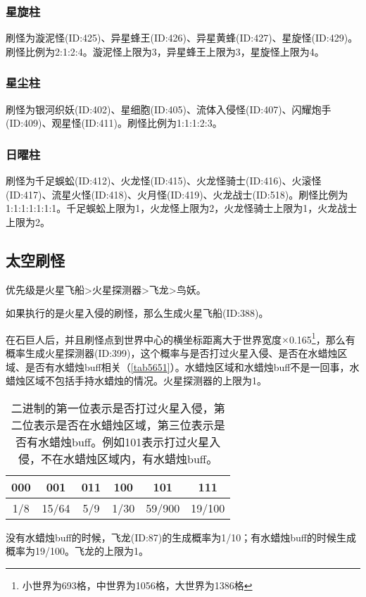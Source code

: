 \subsubsection{星旋柱}
刷怪为漩泥怪(ID:425)、异星蜂王(ID:426)、异星黄蜂(ID:427)、星旋怪(ID:429)。刷怪比例为2:1:2:4。漩泥怪上限为3，异星蜂王上限为3，星旋怪上限为4。

\subsubsection{星尘柱}
刷怪为银河织妖(ID:402)、星细胞(ID:405)、流体入侵怪(ID:407)、闪耀炮手(ID:409)、观星怪(ID:411)。刷怪比例为1:1:1:2:3。

\subsubsection{日曜柱}
刷怪为千足蜈蚣(ID:412)、火龙怪(ID:415)、火龙怪骑士(ID:416)、火滚怪(ID:417)、流星火怪(ID:418)、火月怪(ID:419)、火龙战士(ID:518)。刷怪比例为1:1:1:1:1:1:1。千足蜈蚣上限为1，火龙怪上限为2，火龙怪骑士上限为1，火龙战士上限为2。

\subsection{太空刷怪}
优先级是火星飞船>火星探测器>飞龙>鸟妖。

如果执行的是火星入侵的刷怪，那么生成火星飞船(ID:388)。

在石巨人后，并且刷怪点到世界中心的横坐标距离大于世界宽度$\times$0.165\footnote{小世界为693格，中世界为1056格，大世界为1386格}，那么有概率生成火星探测器(ID:399)，这个概率与是否打过火星入侵、是否在水蜡烛区域、是否有水蜡烛buff相关（\autoref{tab5651}）。水蜡烛区域和水蜡烛buff不是一回事，水蜡烛区域不包括手持水蜡烛的情况。火星探测器的上限为1。

\begin{table}[!h]
    \centering
    \begin{tabular}{cccccc}
         000&001&011&100&101&111\\\hline
         1/8&15/64&5/9&1/30&59/900&19/100 
    \end{tabular}
    \caption{二进制的第一位表示是否打过火星入侵，第二位表示是否在水蜡烛区域，第三位表示是否有水蜡烛buff。例如101表示打过火星入侵，不在水蜡烛区域内，有水蜡烛buff。}
    \label{tab5651}
\end{table}

没有水蜡烛buff的时候，飞龙(ID:87)的生成概率为1/10；有水蜡烛buff的时候生成概率为19/100。飞龙的上限为1。


